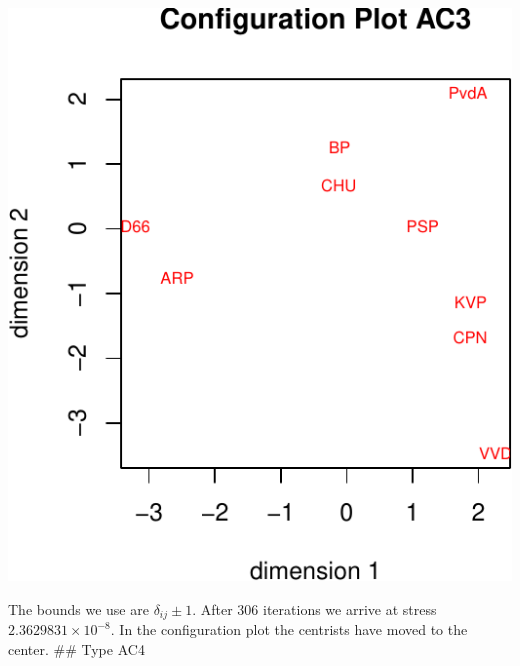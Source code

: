\documentclass[
  12pt,
]{article}
\begin{document}
\begin{center}\includegraphics{smacofAC_files/figure-latex/gruijterh01-2} \end{center}

The bounds we use are \(\delta_{ij}\pm 1\). After 306 iterations
we arrive at stress \ensuremath{2.3629831\times 10^{-8}}. In the configuration plot the centrists
have moved to the center.
\#\# Type AC4
\end{document}
